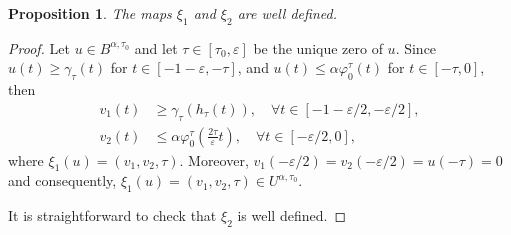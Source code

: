 \documentclass[a4paper,11pt]{article}
\theoremstyle{plain}
\newtheorem{prop}[thm]{Proposition}
\theoremstyle{definition}
\theoremstyle{definition}
\numberwithin{equation}{section}
\begin{document}
\begin{prop}
    The maps $\xi_1$ and $\xi_2$ are well defined.
\end{prop}
\begin{proof}
Let $u\in B^{\alpha,\tau_0}$ and let $\tau\in [\tau_0,\varepsilon]$ be the unique zero of $u$. Since $u(t)\geq \gamma_\tau(t)$ for $t\in[-1-\varepsilon,-\tau]$, and $u(t)\leq \alpha \varphi_0^{\tau}(t)$ for $t\in[-\tau,0]$, then
\begin{align*}
    v_1(t) &\geq \gamma_\tau(h_\tau(t)), \quad \forall t\in[-1-\varepsilon/2, -\varepsilon/2], \\
    v_2(t) & \leq \alpha\varphi_0^{\tau} \left(\frac{2\tau}{\varepsilon} t\right), \quad \forall t\in[-\varepsilon/2,0],
\end{align*}
where $\xi_1(u)=(v_1,v_2,\tau)$. Moreover, $v_1(-\varepsilon/2)=v_2(-\varepsilon/2)=u(-\tau)=0$ and consequently, $\xi_1(u)=(v_1,v_2,\tau)\in U^{\alpha,\tau_0}$.

It is straightforward to check that $\xi_2$ is well defined.
\end{proof}
\end{document}
